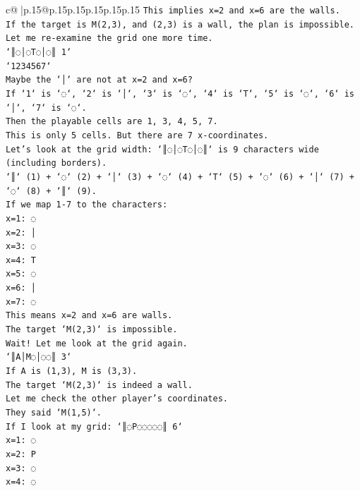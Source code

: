 \documentclass{article}
\begin{document}
{\begin{supertabular}{c@{$\;$}|p{.15\linewidth}@{}p{.15\linewidth}p{.15\linewidth}p{.15\linewidth}p{.15\linewidth}p{.15\linewidth}}
{{{\texttt{This implies x=2 and x=6 are the walls.} \\
\texttt{If the target is M(2,3), and (2,3) is a wall, the plan is impossible.} \\
\texttt{Let me re{-}examine the grid one more time.} \\
\texttt{`║◌│◌T◌│◌║ 1`} \\
\texttt{`1234567`} \\
\texttt{Maybe the `│` are not at x=2 and x=6?} \\
\texttt{If `1` is `◌`, `2` is `│`, `3` is `◌`, `4` is `T`, `5` is `◌`, `6` is `│`, `7` is `◌`.} \\
\texttt{Then the playable cells are 1, 3, 4, 5, 7.} \\
\texttt{This is only 5 cells. But there are 7 x{-}coordinates.} \\
\texttt{Let's look at the grid width: `║◌│◌T◌│◌║` is 9 characters wide (including borders).} \\
\texttt{`║` (1) + `◌` (2) + `│` (3) + `◌` (4) + `T` (5) + `◌` (6) + `│` (7) + `◌` (8) + `║` (9).} \\
\texttt{If we map 1{-}7 to the characters:} \\
\texttt{x=1: ◌} \\
\texttt{x=2: │} \\
\texttt{x=3: ◌} \\
\texttt{x=4: T} \\
\texttt{x=5: ◌} \\
\texttt{x=6: │} \\
\texttt{x=7: ◌} \\
\texttt{This means x=2 and x=6 are walls.} \\
\texttt{The target `M(2,3)` is impossible.} \\
\texttt{Wait! Let me look at the grid again.} \\
\texttt{`║A│M◌│◌◌║ 3`} \\
\texttt{If A is (1,3), M is (3,3).} \\
\texttt{The target `M(2,3)` is indeed a wall.} \\
\texttt{Let me check the other player's coordinates.} \\
\texttt{They said `M(1,5)`.} \\
\texttt{If I look at my grid: `║◌P◌◌◌◌◌║ 6`} \\
\texttt{x=1: ◌} \\
\texttt{x=2: P} \\
\texttt{x=3: ◌} \\
\texttt{x=4: ◌} \\
}}}
\end{supertabular}}
\end{document}
